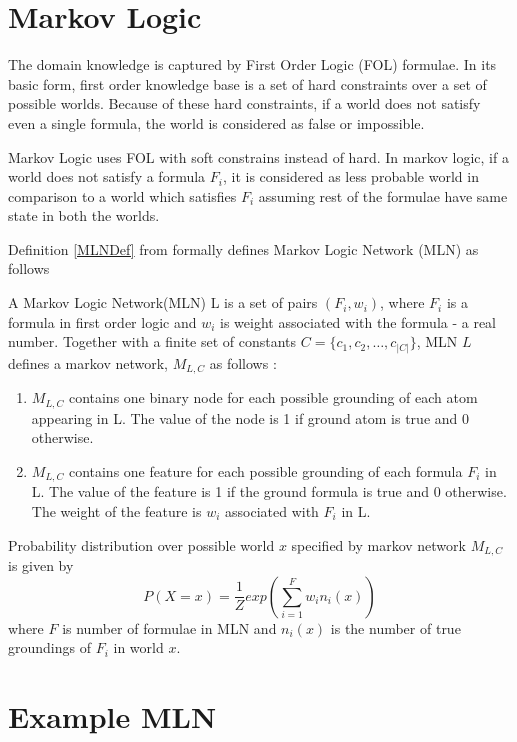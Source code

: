 \section{Markov Logic}
The domain knowledge is captured by First Order Logic (FOL) formulae. In its basic form, 
first order knowledge base is a set of hard constraints over a set of possible worlds.
Because of these hard constraints, if a world does not satisfy even a single formula,
the world is considered as false or impossible.

Markov Logic uses FOL with soft constrains instead of hard. In markov logic, if a world
does not satisfy a formula $F_i$, it is considered as less probable world in comparison to a
world which satisfies $F_i$ assuming rest of the formulae have same state in both the worlds.

Definition \ref{MLNDef} from \cite{MarkovLogic} formally defines 
Markov Logic Network (MLN) as follows

\begin{defn}
	\label{MLNDef}
	A Markov Logic Network(MLN) L is a set of pairs $(F_i, w_i)$, where $F_i$ is a
	formula in first order logic and $w_i$ is weight associated with the formula - a real number.
	Together with a finite set of constants $C = \{c_1, c_2,\ldots,c_{|C|}\}$, MLN $L$
	defines a markov network, $M_{L,C}$ as follows :

	\begin{enumerate}
		\item $M_{L,C}$ contains one binary node for each possible grounding
			of each atom appearing in L. The value of the node is 1 if ground
			atom is true and 0 otherwise.
		\item $M_{L,C}$ contains one feature for each possible grounding of each
			formula $F_i$ in L. The value of the feature is 1 if the ground
			formula is true and 0 otherwise. The weight of the feature is
			$w_i$ associated with $F_i$ in L.
	\end{enumerate}
\end{defn}

Probability distribution over possible world $x$ specified by markov network $M_{L,C}$ is given by
\begin{equation}
	\label{jointDistMLN}
	P(X = x) = \frac{1}{Z} exp \left( \displaystyle \sum_{i = 1}^{F} w_i n_i(x)  \right)
\end{equation}
where $F$ is number of formulae in MLN and $n_i(x)$ is the number of true groundings of
$F_i$ in world $x$.


\section{Example MLN}
